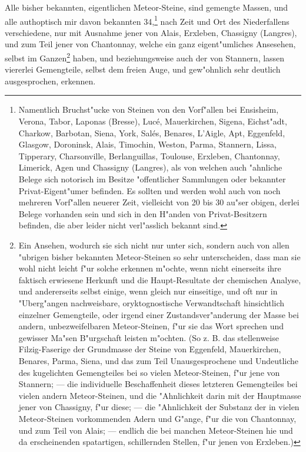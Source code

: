 \documentclass[a4paper, 11pt, oneside, german]{article}
\begin{document}
Alle bisher bekannten, eigentlichen Meteor-Steine, sind gemengte Massen, und alle authoptisch mir davon bekannten 34,\footnote{Namentlich Bruchst"ucke von Steinen von den Vorf"allen bei Ensisheim, Verona, Tabor, Laponas (Bresse), Lucé, Mauerkirchen, Sigena, Eichst"adt, Charkow, Barbotan, Siena, York, Salés, Benares, L'Aigle, Apt, Eggenfeld, Glasgow, Doroninsk, Alais, Timochin, Weston, Parma, Stannern, Lissa, Tipperary, Charsonville, Berlanguillas, Toulouse, Erxleben, Chantonnay, Limerick, Agen und Chassigny (Langres), als von welchen auch "ahnliche Belege sich notorisch im Besitze "offentlicher Sammlungen oder bekannter Privat-Eigent"umer befinden. Es sollten und werden wohl auch von noch mehreren Vorf"allen neuerer Zeit, vielleicht von 20 bis 30 au"ser obigen, derlei Belege vorhanden sein und sich in den H"anden von Privat-Besitzern befinden, die aber leider nicht verl"asslich bekannt sind.} nach Zeit und Ort des Niederfallens verschiedene, nur mit Ausnahme jener von Alais, Erxleben, Chassigny (Langres), und zum Teil jener von Chantonnay, welche ein ganz eigent"umliches Ansesehen, selbst im Ganzen\footnote{Ein Ansehen, wodurch sie sich nicht nur unter sich, sondern auch von allen "ubrigen bisher bekannten Meteor-Steinen so sehr unterscheiden, dass man sie wohl nicht leicht f"ur solche erkennen m"ochte, wenn nicht einerseits ihre faktisch erwiesene Herkunft und die Haupt-Resultate der chemischen Analyse, und andererseits selbst einige, wenn gleich nur einseitige, und oft nur in "Uberg"angen nachweisbare, oryktognostische Verwandtschaft hinsichtlich einzelner Gemengteile, oder irgend einer Zustandsver"anderung der Masse bei andern, unbezweifelbaren Meteor-Steinen, f"ur sie das Wort sprechen und gewisser Ma"sen B"urgschaft leisten m"ochten. (So z. B. das stellenweise Filzig-Faserige der Grundmasse der Steine von Eggenfeld, Mauerkirchen, Benares, Parma, Siena, und das zum Teil Unausgesprochene und Undeutliche des kugelichten Gemengteiles bei so vielen Meteor-Steinen, f"ur jene von Stannern; --- die individuelle Beschaffenheit dieses letzteren Gemengteiles bei vielen andern Meteor-Steinen, und die "Ahnlichkeit darin mit der Hauptmasse jener von Chassigny, f"ur diese; --- die "Ahnlichkeit der Substanz der in vielen Meteor-Steinen vorkommenden Adern und G"ange, f"ur die von Chantonnay, und zum Teil von Alais; --- endlich die bei manchen Meteor-Steinen hie und da erscheinenden spatartigen, schillernden Stellen, f"ur jenen von Erxleben.)} haben, und beziehungsweise auch der von Stannern, lassen viererlei Gemengteile, selbst dem freien Auge, und gew"ohnlich sehr deutlich ausgesprochen, erkennen.
\end{document}
